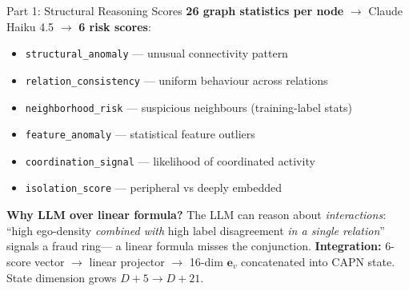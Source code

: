 \documentclass[aspectratio=169,10pt]{beamer}
\begin{document}
\begin{frame}{Part 1: Structural Reasoning Scores}
    \textbf{26 graph statistics per node} $\rightarrow$ Claude Haiku 4.5 $\rightarrow$
    \textbf{6 risk scores}:
    \vspace{0.3em}
    \begin{itemize}\footnotesize
        \item \texttt{structural\_anomaly} --- unusual connectivity pattern
        \item \texttt{relation\_consistency} --- uniform behaviour across relations
        \item \texttt{neighborhood\_risk} --- suspicious neighbours (training-label stats)
        \item \texttt{feature\_anomaly} --- statistical feature outliers
        \item \texttt{coordination\_signal} --- likelihood of coordinated activity
        \item \texttt{isolation\_score} --- peripheral vs deeply embedded
    \end{itemize}
    \vspace{0.4em}
    \textbf{Why LLM over linear formula?}
    The LLM can reason about \emph{interactions}: ``high ego-density \emph{combined with}
    high label disagreement \emph{in a single relation}'' signals a fraud ring---
    a linear formula misses the conjunction.
    \vspace{0.4em}
    \textbf{Integration:} 6-score vector $\rightarrow$ linear projector $\rightarrow$
    16-dim $\mathbf{e}_v$ concatenated into CAPN state. \\
    State dimension grows $D{+}5 \to D{+}21$.
\end{frame}
\end{document}
